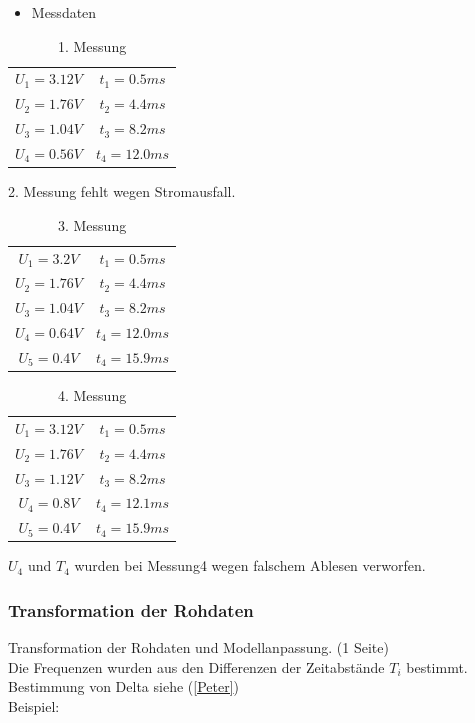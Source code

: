 \documentclass[12pt,a4paper]{article}
\begin{document}
\begin{itemize}
\item Messdaten\centering
\end{itemize}
\begin{table}[H]\centering
\caption{1. Messung}
\begin{tabular}{c|c}
$U_1=3.12V$& $t_1=0.5ms$\\ 
$U_2=1.76V$& $t_2=4.4ms$\\ 
$U_3=1.04V$& $t_3=8.2ms$ \\
$U_4=0.56V$& $t_4=12.0ms$ \\
\end{tabular} 
\end{table}

2. Messung fehlt wegen Stromausfall. \centering

\begin{table}[H]\centering
\caption{3. Messung}
\begin{tabular}{c|c}
$U_1=3.2V$& $t_1=0.5ms$\\ 
$U_2=1.76V$& $t_2=4.4ms$\\ 
$U_3=1.04V$& $t_3=8.2ms$ \\
$U_4=0.64V$& $t_4=12.0ms$ \\
$U_5=0.4V$& $t_4=15.9ms$ \\
\end{tabular} 
\end{table}

\begin{table}[H]\centering
\caption{4. Messung}
\begin{tabular}{c|c}
$U_1=3.12V$& $t_1=0.5ms$\\ 
$U_2=1.76V$& $t_2=4.4ms$\\ 
$U_3=1.12V$& $t_3=8.2ms$ \\
$U_4=0.8V$& $t_4=12.1ms$ \\
$U_5=0.4V$& $t_4=15.9ms$ \\
\end{tabular} 
\end{table}
$U_4$ und $T_4$ wurden bei Messung4 wegen falschem Ablesen verworfen.

\newpage
\subsubsection{Transformation der Rohdaten}
Transformation der Rohdaten und Modellanpassung. (1 Seite)\\
Die Frequenzen wurden aus den Differenzen der Zeitabstände $T_i$ bestimmt. Bestimmung von Delta siehe (\ref{Peter}) \\
Beispiel:
\end{document}
